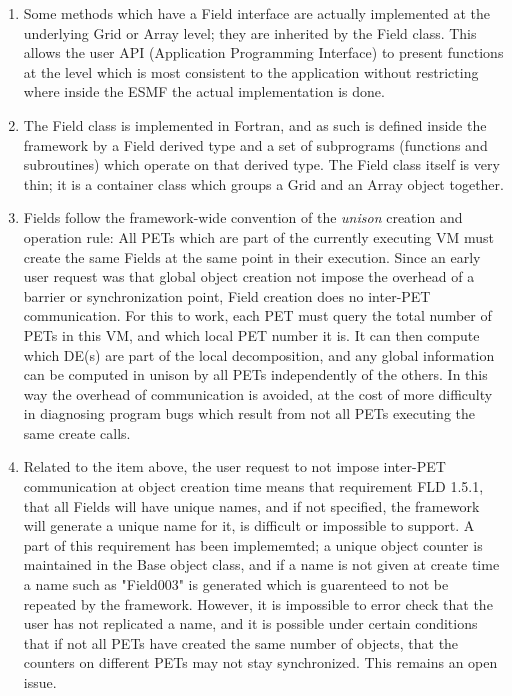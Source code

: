 

\begin{enumerate}

\item Some methods which have a Field interface are actually 
implemented at the underlying Grid or Array level; they
are inherited by the Field class.  This allows the user
API (Application Programming Interface) to present functions at
the level which is most consistent to the application without
restricting where inside the ESMF the actual implementation
is done.

\item The Field class is implemented in Fortran, and as such is
defined inside the framework by a Field derived type and a set of 
subprograms (functions and subroutines) which operate on that derived type.  
The Field class itself is very thin; it is a container class which
groups a Grid and an Array object together.

\item Fields follow the framework-wide convention of the
{\it unison} creation and operation rule: All PETs which are
part of the currently executing VM must create the
same Fields at the same point in their execution.  Since an early
user request was that global object creation not impose the overhead of
a barrier or synchronization point, Field creation does no inter-PET
communication.  For this to work, each PET must query the total number
of PETs in this VM, and which local PET number it is.  It can then
compute which DE(s) are part of the local decomposition, and any
global information can be computed in unison by all PETs independently
of the others.  In this way the overhead of communication is avoided,
at the cost of more difficulty in diagnosing program bugs which result
from not all PETs executing the same create calls.

\item Related to the item above, the user request to not impose
inter-PET communication at object creation time means that requirement
FLD 1.5.1, that all Fields will have unique names, and if not specified, 
the framework will generate a unique name for it, is difficult or
impossible to support.  A part of this requirement has been implememted;
a unique object counter is maintained in the Base object class, and if
a name is not given at create time a name such as "Field003" is generated
which is guarenteed to not be repeated by the framework.   However, it
is impossible to error check that the user has not replicated a name,
and it is possible under certain conditions that if not all PETs have
created the same number of objects, that the counters on different PETs
may not stay synchronized.   This remains an open issue.

\end{enumerate}
